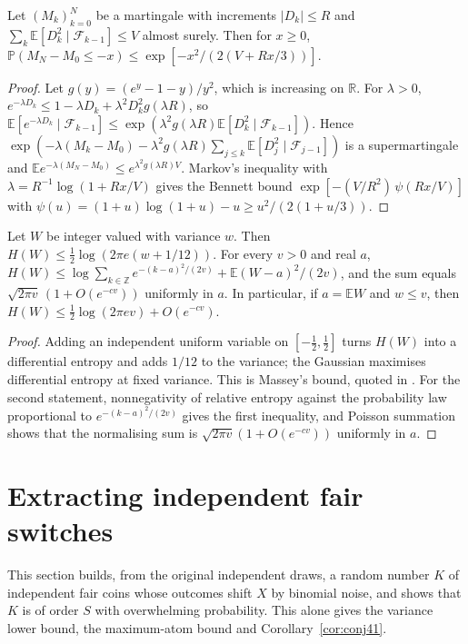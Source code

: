 \documentclass[11pt,a4paper]{article}
\theoremstyle{definition}\newtheorem{remark}[theorem]{Remark}\newtheorem{conjecture}{Conjecture}
\newcommand{\E}{\mathbb E}\newcommand{\Prb}{\mathbb P}\newcommand{\Var}{\operatorname{Var}}
\begin{document}
\begin{lemma}\label{lem:freedman}
Let $(M_k)_{k=0}^N$ be a martingale with increments $|D_k|\le R$ and $\sum_k\E[D_k^2\mid\mathcal F_{k-1}]\le V$ almost surely. Then for $x\ge0$,
$\Prb(M_N-M_0\le -x)\le\exp[-x^2/(2(V+Rx/3))]$.
\end{lemma}
\begin{proof}
Let $g(y)=(e^y-1-y)/y^2$, which is increasing on $\mathbb R$. For $\lambda>0$, $e^{-\lambda D_k}\le1-\lambda D_k+\lambda^2D_k^2g(\lambda R)$, so $\E[e^{-\lambda D_k}\mid\mathcal F_{k-1}]\le\exp(\lambda^2 g(\lambda R)\E[D_k^2\mid\mathcal F_{k-1}])$. Hence $\exp(-\lambda(M_k-M_0)-\lambda^2g(\lambda R)\sum_{j\le k}\E[D_j^2\mid\mathcal F_{j-1}])$ is a supermartingale and $\E e^{-\lambda(M_N-M_0)}\le e^{\lambda^2g(\lambda R)V}$. Markov's inequality with $\lambda=R^{-1}\log(1+Rx/V)$ gives the Bennett bound $\exp[-(V/R^2)\,\psi(Rx/V)]$ with $\psi(u)=(1+u)\log(1+u)-u\ge u^2/(2(1+u/3))$.
\end{proof}

\begin{lemma}\label{lem:massey}
Let $W$ be integer valued with variance $w$. Then $H(W)\le\tfrac12\log(2\pi e(w+1/12))$. For every $v>0$ and real $a$,
$H(W)\le\log\sum_{k\in\mathbb Z}e^{-(k-a)^2/(2v)}+\E(W-a)^2/(2v)$, and the sum equals $\sqrt{2\pi v}\,(1+O(e^{-cv}))$ uniformly in $a$. In particular, if $a=\E W$ and $w\le v$, then $H(W)\le\tfrac12\log(2\pi e v)+O(e^{-cv})$.
\end{lemma}
\begin{proof}
Adding an independent uniform variable on $[-\tfrac12,\tfrac12]$ turns $H(W)$ into a differential entropy and adds $1/12$ to the variance; the Gaussian maximises differential entropy at fixed variance. This is Massey's bound, quoted in \cite[Theorem~1.1]{pelekis}. For the second statement, nonnegativity of relative entropy against the probability law proportional to $e^{-(k-a)^2/(2v)}$ gives the first inequality, and Poisson summation shows that the normalising sum is $\sqrt{2\pi v}(1+O(e^{-cv}))$ uniformly in $a$.
\end{proof}

\section{Extracting independent fair switches}\label{sec:switches}
This section builds, from the original independent draws, a random number $K$ of independent fair coins whose outcomes shift $X$ by binomial noise, and shows that $K$ is of order $S$ with overwhelming probability. This alone gives the variance lower bound, the maximum-atom bound and Corollary~\ref{cor:conj41}.
\end{document}
